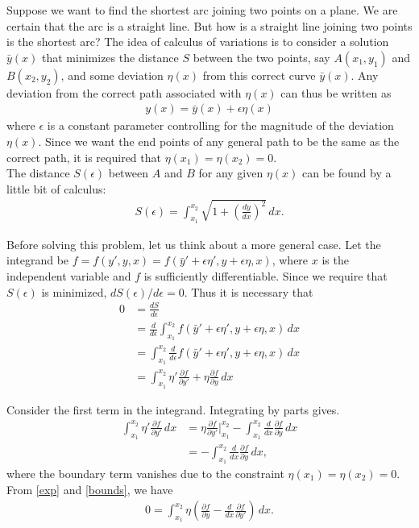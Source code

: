 \documentclass{article}
\newcommand{\p}{\partial}
\newcommand{\f}[2]{\frac{#1}{#2}}
\newcommand{\lp}{\left(}
\newcommand{\rp}{\right)}
\begin{document}
Suppose we want to find the shortest arc joining two points on a plane. We are certain that the arc is a straight line. But how is a straight line joining two points is the shortest arc? The idea of calculus of variations is to consider a solution $\bar{y}(x)$ that minimizes the distance $S$ between the two points, say $A(x_1,y_1)$ and $B(x_2,y_2)$, and some deviation $\eta(x)$ from this correct curve $\bar{y}(x)$. Any deviation from the correct path associated with $\eta(x)$ can thus be written as
\begin{align}
y(x) = \bar{y}(x) + \epsilon \eta(x)
\end{align}
where $\epsilon$ is a constant parameter controlling for the magnitude of the deviation $\eta(x)$. Since we want the end points of any general path to be the same as the correct path, it is required that $\eta(x_1) = \eta(x_2) = 0$.\\

The distance $S(\epsilon)$ between $A$ and $B$ for any given $\eta(x)$ can be found by a little bit of calculus:
\begin{align}
S(\epsilon) = \int^{x_2}_{x_1}\sqrt{1 + \left(\frac{dy}{dx}\right)^2}\,dx.
\end{align}

Before solving this problem, let us think about a more general case. Let the integrand be $f = f(y',y,x) = f(\bar{y}'+\epsilon\eta',y+\epsilon\eta,x)$, where $x$ is the independent variable and $f$ is sufficiently differentiable. Since we require that $S(\epsilon)$ is minimized, $dS(\epsilon)/d\epsilon = 0$. Thus it is necessary that
\begin{align}\label{exp}
0 &= \f{dS}{d\epsilon} \nonumber\\ 
&= \f{d}{d\epsilon}\int^{x_2}_{x_1}f(\bar{y}'+\epsilon\eta',y+\epsilon\eta,x)\,dx \nonumber\\
&= \int^{x_2}_{x_1}\f{d}{d\epsilon}f(\bar{y}'+\epsilon\eta',y+\epsilon\eta,x)\,dx \nonumber\\
&= \int^{x_2}_{x_1}\eta'\f{\p f}{\p y'} + \eta\f{\p f}{\p y}\,dx 
\end{align}

Consider the first term in the integrand. Integrating by parts gives.
\begin{align}\label{bounds}
\int^{x_2}_{x_1}\eta'\f{\p f}{\p y'} \,dx
&= \eta\f{\p f}{\p y'}\bigg\vert_{x_1}^{x_2} -  \int^{x_2}_{x_1}  \f{d}{dx}\f{\p f}{\p y} \,dx \nonumber\\
&= -  \int^{x_2}_{x_1}  \f{d}{dx}\f{\p f}{\p y} \,dx,
\end{align} 
where the boundary term vanishes due to the constraint $\eta(x_1) = \eta(x_2) = 0$. From \eqref{exp} and \eqref{bounds}, we have
\begin{align}\label{euler}
0 = \int^{x_2}_{x_1} \eta\lp \f{\p f}{\p y} - \f{d}{dx}\f{\p f}{\p y'}  \rp\,dx. 
\end{align}
\end{document}
